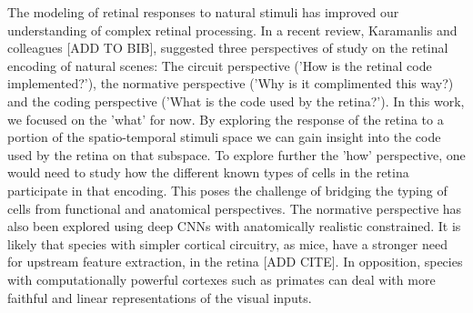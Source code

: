 The modeling of retinal responses to natural stimuli has improved our
understanding of complex retinal processing. In a recent review, Karamanlis and
colleagues \citep{} [ADD TO BIB], suggested three perspectives of study on the
retinal
encoding of natural scenes: The circuit perspective ('How is the retinal code
implemented?'), the normative perspective ('Why is it complimented this way?)
and the coding perspective ('What is the code used by the retina?'). In this
work, we focused on the 'what' for now. By exploring the response of the retina
to a portion of
the spatio-temporal stimuli space we can gain insight into the code used by the
retina on that subspace. To explore further the 'how' perspective, one would
need to study how the different known types of cells in the retina participate
in that encoding. This poses the challenge of bridging the typing of cells from
functional and anatomical perspectives.
The normative perspective has also been explored using deep CNNs with
anatomically realistic constrained. It is likely that species with simpler
cortical circuitry, as mice, have a stronger need for upstream feature
extraction, in the retina [ADD CITE]. In opposition, species with computationally powerful
cortexes such as primates can deal with more faithful and linear
representations
of the visual inputs.
